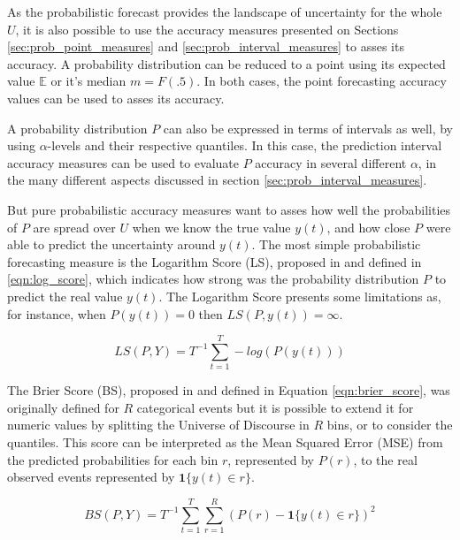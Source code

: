 As the probabilistic forecast provides the landscape of uncertainty for the whole $U$, it is also possible to use the accuracy measures presented on Sections \ref{sec:prob_point_measures} and \ref{sec:prob_interval_measures} to asses its accuracy. A probability distribution can be reduced to a point using its expected value $\mathbb{E}$ or it's median $m = F(.5)$. In both cases, the point forecasting accuracy values can be used to asses its accuracy.

A probability distribution $P$ can also be expressed in terms of intervals as well, by using $\alpha$-levels and their respective quantiles. In this case, the prediction interval accuracy measures can be used to evaluate $P$ accuracy in several different $\alpha$, in the many different aspects discussed in section \ref{sec:prob_interval_measures}.

But pure probabilistic accuracy measures want to asses how well the probabilities of $P$ are spread over $U$ when we know the true value $y(t)$, and how close $P$ were able to predict the uncertainty around $y(t)$. The most simple probabilistic forecasting measure is the Logarithm Score (LS), proposed in \cite{Good1952} and defined in \ref{eqn:log_score}, which indicates how strong was the probability distribution $P$ to predict the real value $y(t)$. The Logarithm Score presents some limitations as, for instance, when $P(y(t)) = 0$ then $LS(P,y(t)) = \infty$.

\begin{equation}
    LS(P,Y) = T^{-1} \sum_{t=1}^T -log(P(y(t)))
    \label{eqn:log_score}
\end{equation}


The Brier Score (BS), proposed in \cite{Brier1950} and defined in Equation \ref{eqn:brier_score}, was originally defined for $R$ categorical events but it is possible to extend it for numeric values by splitting the Universe of Discourse in $R$ bins, or to consider the quantiles. This score can be interpreted as the Mean Squared Error (MSE) from the predicted probabilities for each bin $r$, represented by $P(r)$, to the real observed events represented by $\mathbf{1}\{ y(t) \in r\}$.

\begin{equation}
    BS(P,Y) = T^{-1} \sum_{t=1}^T \sum_{r=1}^R ( P(r) - \mathbf{1}\{ y(t) \in r\})^2
    \label{eqn:brier_score}
\end{equation}


